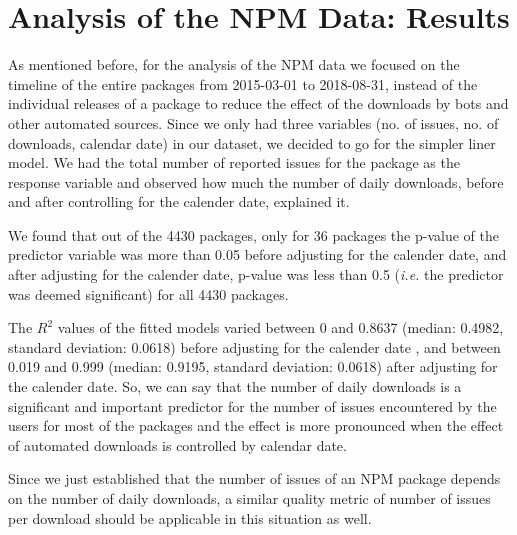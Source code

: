 \documentclass[smallextended]{svjour3}       %
\begin{document}
\section{Analysis of the NPM Data: Results}\label{s:npm}

As mentioned before, for the analysis of the NPM data we focused on the timeline of the entire packages from 2015-03-01 to 2018-08-31, instead of the individual releases of a package to reduce the effect of the downloads by bots and other automated sources. Since we only had  three variables (no. of issues, no. of downloads, calendar date) in our dataset, we decided to go for the simpler liner model. We had the total number of reported issues for the package as the response variable and observed how much the number of daily downloads, before and after controlling for the calender date, explained it. 

We found that out of the 4430 packages, only for 36 packages the p-value of the predictor variable was more than 0.05 before adjusting for the calender date, and after adjusting for the calender date, p-value was less than 0.5 (\emph{i.e.} the predictor was deemed significant) for all 4430 packages. 

The $R^2$ values of the fitted models varied between 0 and 0.8637 (median: 0.4982, standard deviation: 0.0618) before adjusting for the calender date , and between 0.019 and 0.999 (median: 0.9195, standard deviation: 0.0618) after  adjusting for the calender date. So, we can say that the number of daily downloads is a significant and important predictor for the number of issues encountered by the users for most of the packages and the effect is more pronounced when the effect of automated downloads is controlled by calendar date. 

Since we just established that the number of issues of an NPM package depends on the number of daily downloads, a similar quality metric of number of issues per download should be applicable in this situation as well.  
\end{document}
